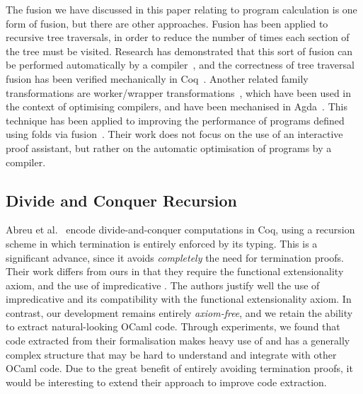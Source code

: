 \documentclass[a4paper,anonymous, UKenglish,cleveref, autoref, thm-restate]{lipics-v2021}
\newcommand{\mvol}[1]{\textcolor{blue}{\textsc{Michael}: #1}}
\begin{document}
The fusion we have discussed in this
paper relating to program calculation is one form of fusion, but there are other
approaches.
%
Fusion has been applied to recursive tree traversals, in order to reduce the
number of times each section of the tree must be visited. Research has
demonstrated that this sort of fusion can be performed automatically by a
compiler~\cite{10.1145/3133900}, and the correctness of tree traversal fusion
has been verified mechanically in Coq~\cite{10.1145/3377555.3377884}.
%
Another related family transformations are worker/wrapper
transformations~\cite{gill09}, which have been used in the context of optimising
compilers, and have been mechanised in Agda~\cite{SCULTHORPE_HUTTON_2014}. This
technique has been applied to improving the performance of programs defined
using folds via fusion~\cite{hutton10}. Their work does not focus on the use of
an interactive proof assistant, but rather on the automatic optimisation of
programs by a compiler.

\subsection{Divide and Conquer Recursion}\label{sec:reccoq}

Abreu et al.~\cite{AbreuDHJMS23} encode divide-and-conquer computations in Coq,
using a recursion scheme in which termination is entirely enforced by its
typing. This is a significant advance, since it avoids \emph{completely} the
need for termination proofs. Their work differs from ours in that they require
the functional extensionality axiom, and the use of impredicative . The
authors justify well the use of impredicative  and its compatibility
with the functional extensionality axiom. In contrast, our development remains
entirely \emph{axiom-free}, and we retain the ability to extract natural-looking
OCaml code.
Through experiments, we found that code extracted from their formalisation makes
heavy use of  and has a generally complex structure that may be
hard to understand and integrate with other OCaml code. Due to the great benefit
of entirely avoiding termination proofs, it would be interesting to extend their
approach to improve code extraction.
\end{document}
